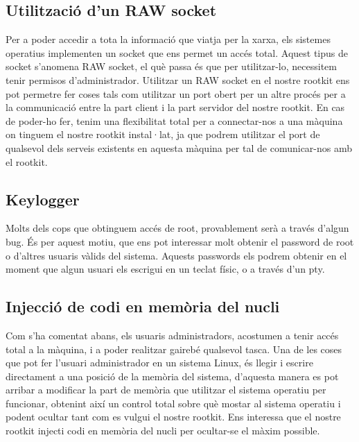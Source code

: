 \subsection{Utilització d'un RAW socket}
Per a poder accedir a tota la informació que viatja per la xarxa, els sistemes operatius implementen un socket que ens permet
un accés total. Aquest tipus de socket s'anomena RAW socket, el què passa és que per utilitzar-lo, necessitem tenir permisos
d'administrador.
Utilitzar un RAW socket en el nostre rootkit ens pot permetre fer coses tals com utilitzar un port obert per un altre procés
per a la communicació entre la part client i la part servidor del nostre rootkit. En cas de poder-ho fer, tenim una flexibilitat
total per a connectar-nos a una màquina on tinguem el nostre rootkit instal·lat, ja que podrem utilitzar el port de qualsevol dels
serveis existents en aquesta màquina per tal de comunicar-nos amb el rootkit.

\subsection{Keylogger}
Molts dels cops que obtinguem accés de root, provablement serà a través d'algun bug. És per aquest motiu, que ens pot interessar molt
obtenir el password de root o d'altres usuaris vàlids del sistema. Aquests passwords els podrem obtenir en el moment que algun usuari
els escrigui en un teclat físic, o a través d'un pty.

\subsection{Injecció de codi en memòria del nucli}
Com s'ha comentat abans, els usuaris administradors, acostumen a tenir accés total a la màquina, i a poder realitzar gairebé qualsevol tasca.
Una de les coses que pot fer l'usuari administrador en un sistema Linux, és llegir i escrire directament a una posició de la
memòria del sistema, d'aquesta manera es pot arribar a modificar la part de memòria que utilitzar el sistema operatiu per funcionar,
obtenint així un control total sobre què mostar al sistema operatiu i podent ocultar tant com es vulgui el nostre rootkit.
Ens interessa que el nostre rootkit injecti codi en memòria del nucli per ocultar-se el màxim possible.




